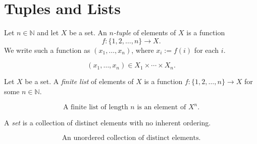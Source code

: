 
\section{Tuples and Lists}

\begin{definition}[$n$-tuple]
\label{def:n-tuple}
Let $n \in \mathbb{N}$ and let $X$ be a set.
An \emph{$n$-tuple} of elements of $X$ is a function
\[
f : \{1,2,\dots,n\} \to X.
\]
We write such a function as $(x_1,\dots,x_n)$, where $x_i := f(i)$ for each $i$.
\end{definition}

\begin{remark*}
\[ (x_1,\ldots,x_n)\in X_1\times\cdots\times X_n. \]
\end{remark*}

\begin{remark*}[Flash]
\end{remark*}

\begin{definition}
\label{def:finite-list}
Let $X$ be a set.
A \emph{finite list} of elements of $X$ is a function
$f : \{1,2,\dots,n\} \to X$ for some $n \in \mathbb{N}$.
\end{definition}

\begin{remark*}
\[ \text{A finite list of length }n\text{ is an element of }X^n. \]
\end{remark*}

\begin{remark*}[Flash]
\end{remark*}

\begin{definition}[Set]
\label{def:set-la}
A \emph{set} is a collection of distinct elements with no inherent ordering.
\end{definition}

\begin{remark*}
\[ \text{An unordered collection of distinct elements.} \]
\end{remark*}

\begin{remark*}[Flash]
\end{remark*}


